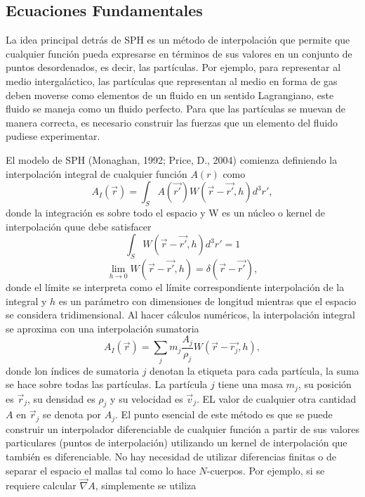 \documentclass[a4paper,openright,12pt]{book}
\begin{document}
\subsection{Ecuaciones Fundamentales}
La idea principal detrás de SPH es un método de interpolación que permite que cualquier función pueda expresarse en términos de sus valores en un conjunto de puntos desordenados, es decir, las partículas. Por ejemplo, para representar al medio intergaláctico, las partículas que representan al medio en forma de gas deben moverse como elementos de un fluido en un sentido Lagrangiano, este fluido se maneja como un fluido perfecto. Para que las partículas se muevan de manera correcta, es necesario construir las fuerzas que un elemento del fluido pudiese experimentar. 

El modelo de SPH (Monaghan, 1992; Price, D., 2004) \cite{b8, b9} comienza definiendo la interpolación integral de cualquier función $A(r)$ como
\begin{equation}
 A_{I}(\vec{r})
 =
 \int_{S} 
 A(\vec{r'})W(\vec{r}- \vec{r'}, h)d^{3}r',\label{eqn2.16}
\end{equation} 
donde la integración es sobre todo el espacio y W es un núcleo o kernel de interpolación quue debe satisfacer
\begin{equation}
 \int_{S}W(\vec{r}- \vec{r'},h)d^{3}r' = 1\label{eqn2.17}
\end{equation}
\begin{equation}
\lim_{h \to 0} W(\vec{r}-\vec{r'},h) = \delta(\vec{r}-\vec{r'}),\label{eqn2.18}
\end{equation}
donde el límite se interpreta como el límite correspondiente interpolación de la integral y $h$ es un parámetro con dimensiones de longitud mientras que el espacio se considera tridimensional. 
Al hacer cálculos numéricos, la interpolación integral se aproxima con una interpolación sumatoria
\begin{equation}
 A_{I}(\vec{r})
 =
 \sum_{j} m_{j} \frac{A_{j}}{\rho_{j}} W(\vec{r}- \vec{r_{j}},h),\label{eqn2.19}
\end{equation}
donde lon índices de sumatoria $j$ denotan la etiqueta para cada partícula, la suma se hace sobre todas las partículas. La partícula $j$ tiene una masa $m_{j}$, su posición es $\vec{r}_{j}$, su densidad es $\rho_{j}$ y su velocidad es $\vec{v}_{j}$. EL valor de cualquier otra cantidad $A$ en $\vec{r}_{j}$ se denota por $A_{j}$. El punto esencial de este método es que se puede construir un interpolador diferenciable de cualquier función a partir de sus valores particulares (puntos de interpolación) utilizando un kernel de interpolación que también es diferenciable. No hay necesidad de utilizar diferencias finitas o de separar el espacio el mallas tal como lo hace $N$-cuerpos. Por ejemplo, si se requiere calcular $\vec{\nabla}A$, simplemente se utiliza
\end{document}
